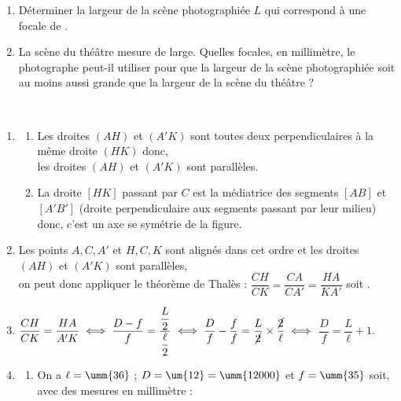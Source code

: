 \begin{exercice}[CRPE 2016 G2]
\begin{minipage}{9.5cm}
\begin{enumerate}
         \begin{enumerate}
            \item Déterminer la largeur de la scène photographiée $L$ qui correspond à une focale de .
            \item La scène du théâtre mesure  de large. Quelles focales, en millimètre, le photographe peut-il utiliser pour que la largeur de la scène photographiée soit au moins aussi grande que la largeur de la scène du théâtre ?
         \end{enumerate}
      \end{enumerate}
   \end{minipage}
\end{exercice}

\begin{corrige}
\ \\ [-5mm]
   \begin{enumerate}
      \item
         \begin{enumerate}
            \item Les droites $(AH)$ et $(A'K)$ sont toutes deux perpendiculaires à la même droite $(HK)$ donc, \\
               {\blue les droites $(AH)$ et $(A'K)$ sont parallèles}.
            \item La droite $[HK]$ passant par $C$ est la médiatrice des segments $[AB]$ et $[A'B']$ (droite perpendiculaire aux segments passant par leur milieu) donc, {\blue c'est un axe se symétrie de la figure}.
         \end{enumerate}
      \setcounter{enumi}{1}
      \item Les points $A, C, A'$ et $H, C, K$ sont alignés dans cet ordre et les droites $(AH)$ et $(A'K)$ sont parallèles, \\ [1mm]
         on peut donc appliquer le théorème de Thalès : $\dfrac{CH}{CK} =\dfrac{CA}{CA'} =\dfrac{HA}{KA'}$ soit . \\
      \item $\dfrac{CH}{CK} =\dfrac{HA}{A'K} \iff \dfrac{D-f}{f} =\dfrac{\dfrac{L}{2}}{\dfrac{\ell}{2}} \iff \dfrac{D}{f}-\dfrac{f}{f}=\dfrac{L}{\cancel{2}}\times\dfrac{\cancel{2}}{\ell} \iff$ {\blue $\dfrac{D}{f} =\dfrac{L}{\ell}+1$}. \\ [1mm]
      \item
         \begin{enumerate}
            \item On a $\ell =\umm{36}$ ; $D =\um{12} =\umm{12000}$ et $f =\umm{35}$ soit, avec des mesures en millimètre : \\ [1mm]

\end{enumerate}
\end{enumerate}
\end{corrige}
